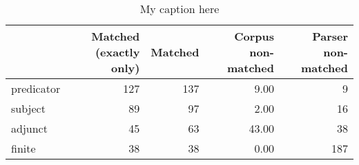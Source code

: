 \begin{table}[!ht]
\centering
\begin{tabular}{lrrrr}
\toprule
{} &  Matched (exactly only) &  Matched &  Corpus non-matched &  Parser non-matched \\
\midrule
predicator &                     127 &      137 &                9.00 &                   9 \\
subject    &                      89 &       97 &                2.00 &                  16 \\
adjunct    &                      45 &       63 &               43.00 &                  38 \\
finite     &                      38 &       38 &                0.00 &                 187 \\
\bottomrule
\end{tabular}
\caption{My caption here}
\label{tab:unit-elements-ocd-data}
\end{table}